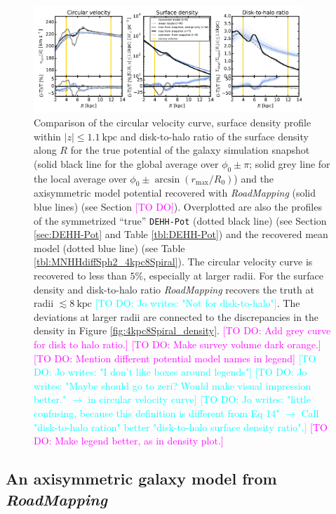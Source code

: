 \documentclass[iop,revtex4,numberedappendix,appendixfloats]{emulateapj}
\newcommand{\RM}{{\sl RoadMapping}}
\newcommand{\Wilma}[1]{\textcolor{Magenta}{#1}}
\newcommand{\Jo}[1]{\textcolor{Cyan}{#1}}
\begin{document}
\begin{figure}[!htbp]
\centering
\includegraphics[width=0.9\textwidth]{fig/MNdHHdiffSph2_4kpc8Spiral_a_test1_vcirc_surfdens_overview.pdf}
\caption{Comparison of the circular velocity curve, surface density profile within $|z|\leq1.1~\text{kpc}$ and disk-to-halo ratio of the surface density along $R$ for the true potential of the galaxy simulation snapshot (solid black line for the global average over $\phi_0\pm\pi$; solid grey line for the local average over $\phi_0\pm \arcsin(r_\text{max}/R_0)$) and the axisymmetric model potential recovered with \RM{} (solid blue lines) (see Section \Wilma{[TO DO]}). Overplotted are also the profiles of the symmetrized ``true'' \texttt{DEHH-Pot} (dotted black line) (see Section \ref{sec:DEHH-Pot} and Table \ref{tbl:DEHH-Pot}) and the recovered mean model (dotted blue line) (see Table \ref{tbl:MNHHdiffSph2_4kpc8Spiral}). The circular velocity curve is recovered to less than $5\%$, especially at larger radii. For the surface density and disk-to-halo ratio \RM{} recovers the truth at radii $\lesssim 8~\text{kpc}$ \Jo{[TO DO: Jo writes: "Not for disk-to-halo"]}. The deviations at larger radii are connected to the discrepancies in the density in Figure \ref{fig:4kpc8Spiral_density}. \Wilma{[TO DO: Add grey curve for disk to halo ratio.]} \Wilma{[TO DO: Make survey volume dark orange.]} \Wilma{[TO DO: Mention different potential model names in legend]} \Jo{[TO DO: Jo writes: "I don't like boxes around legends"]} \Jo{[TO DO: Jo writes: "Maybe should go to zeri? Would make visual impression better." $\longrightarrow$  in circular velocity curve]} \Jo{[TO DO: Jo writes: "little confusing, because this definition is different from Eq 14" $\longrightarrow$ Call "disk-to-halo ration" better "disk-to-halo surface density ratio".]} \Wilma{[TO DO: Make legend better, as in density plot.]}}
\label{fig:4kpc8Spiral_vcirc_surfdens}
\end{figure}


\subsection{An axisymmetric galaxy model from \RM{}} \label{sec:results_part1}
\end{document}
